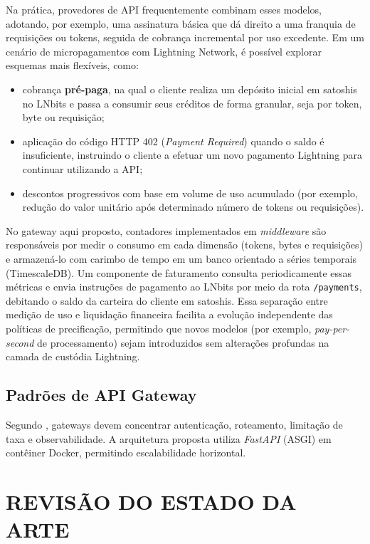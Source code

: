 \documentclass[openright]{normas-utf-tex}
\begin{document}
Na prática, provedores de API frequentemente combinam esses modelos, adotando, por exemplo, uma assinatura básica que dá direito a uma franquia de requisições ou tokens, seguida de cobrança incremental por uso excedente. Em um cenário de micropagamentos com Lightning Network, é possível explorar esquemas mais flexíveis, como:

\begin{itemize}
    \item cobrança \textbf{pré-paga}, na qual o cliente realiza um depósito inicial em satoshis no LNbits e passa a consumir seus créditos de forma granular, seja por token, byte ou requisição;
    \item aplicação do código HTTP 402 (\textit{Payment Required}) quando o saldo é insuficiente, instruindo o cliente a efetuar um novo pagamento Lightning para continuar utilizando a API;
    \item descontos progressivos com base em volume de uso acumulado (por exemplo, redução do valor unitário após determinado número de tokens ou requisições).
\end{itemize}

No gateway aqui proposto, contadores implementados em \textit{middleware} são responsáveis por medir o consumo em cada dimensão (tokens, bytes e requisições) e armazená-lo com carimbo de tempo em um banco orientado a séries temporais (TimescaleDB). Um componente de faturamento consulta periodicamente essas métricas e envia instruções de pagamento ao LNbits por meio da rota \texttt{/payments}, debitando o saldo da carteira do cliente em satoshis. Essa separação entre medição de uso e liquidação financeira facilita a evolução independente das políticas de precificação, permitindo que novos modelos (por exemplo, \textit{pay-per-second} de processamento) sejam introduzidos sem alterações profundas na camada de custódia Lightning.

\section{Padrões de API Gateway}
Segundo , gateways devem concentrar autenticação, roteamento, limitação de taxa e observabilidade. A arquitetura proposta utiliza \textit{FastAPI} (ASGI) em contêiner Docker, permitindo escalabilidade horizontal.

\chapter{REVISÃO DO ESTADO DA ARTE}
\end{document}
